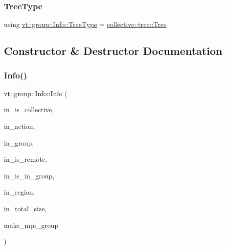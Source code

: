 \mbox{\label{structvt_1_1group_1_1_info_a7682ac1b37adcfcc2f10edee9d34bdc8}} 
\subsubsection{\texorpdfstring{Tree\+Type}{TreeType}}
{\footnotesize\ttfamily using \hyperlink{structvt_1_1group_1_1_info_a7682ac1b37adcfcc2f10edee9d34bdc8}{vt\+::group\+::\+Info\+::\+Tree\+Type} =  \hyperlink{structvt_1_1collective_1_1tree_1_1_tree}{collective\+::tree\+::\+Tree}}



\subsection{Constructor \& Destructor Documentation}
\mbox{\label{structvt_1_1group_1_1_info_ae037ba873e2888a5783ac87eb5f7a33c}} 
\subsubsection{\texorpdfstring{Info()}{Info()}\hspace{0.1cm}{\footnotesize\ttfamily [1/5]}}
{\footnotesize\ttfamily vt\+::group\+::\+Info\+::\+Info (\begin{DoxyParamCaption}\item[{bool const \&}]{in\+\_\+is\+\_\+collective,  }\item[{\hyperlink{namespacevt_ae0a5a7b18cc99d7b732cb4d44f46b0f3}{Action\+Type}}]{in\+\_\+action,  }\item[{\hyperlink{namespacevt_a27b5e4411c9b6140c49100e050e2f743}{Group\+Type} const}]{in\+\_\+group,  }\item[{bool const \&}]{in\+\_\+is\+\_\+remote,  }\item[{bool const \&}]{in\+\_\+is\+\_\+in\+\_\+group,  }\item[{\hyperlink{structvt_1_1group_1_1_info_rooted_a127ac5ebcfb9871621c1f66dba481c0b}{Region\+Ptr\+Type}}]{in\+\_\+region,  }\item[{\hyperlink{structvt_1_1group_1_1region_1_1_region_a9bb381adf31111aae34dbc644bad6c1f}{Region\+Type\+::\+Size\+Type} const \&}]{in\+\_\+total\+\_\+size,  }\item[{bool}]{make\+\_\+mpi\+\_\+group }\end{DoxyParamCaption})\hspace{0.3cm}{\ttfamily [protected]}}

